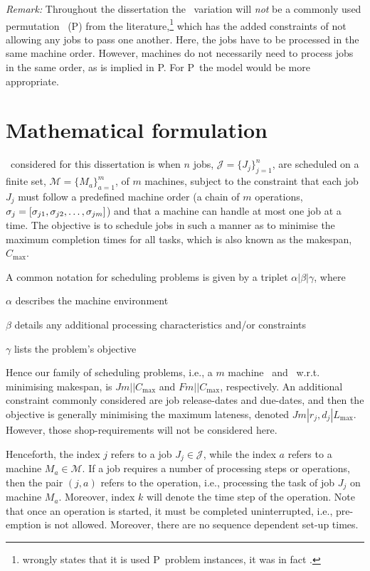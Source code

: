 \emph{Remark:} Throughout the dissertation the \FSP\ variation will \emph{not} 
be a commonly used permutation \fsp\ (P\FSP) from the 
literature,\footnote{ wrongly states that it is used P\FSP\ problem
    instances, it was in fact \FSP.} 
which has the added constraints of not allowing any jobs to pass one another.
Here, the jobs have to be processed in the same machine order. However, 
machines do not necessarily need to process jobs in the same order, as is 
implied in P\FSP. For P\FSP\ the \citet{Manne60} model would be more 
appropriate.

\section{Mathematical formulation}
\Jsp\ considered for this dissertation is when $n$ jobs, 
$\mathcal{J}=\{J_j\}_{j=1}^n$, are scheduled on a finite set, 
$\mathcal{M}=\{M_a\}_{a=1}^m$, of $m$ machines, subject to the constraint that 
each job $J_j$ must follow a predefined machine order (a chain of 
$m$ operations, ${\mathbf{\sigma}}_j=[\sigma_{j1},\sigma_{j2},\dotsc,\sigma_{jm}]$) and 
that a machine can handle at most one job at a time. 
The objective is to schedule jobs in such a manner as to minimise the maximum 
completion times for all tasks, which is also known as the makespan, 
$C_{\max}$. 

A common notation for scheduling problems \citep[cf. Chapter 2 in ][]{Pinedo08} 
is given by a triplet $\alpha|\beta|\gamma$, where 
\begin{enumerate*}[itemjoin*={, and finally}, label={{}}]
  \item $\alpha$ describes the machine environment
  \item $\beta$ details any additional processing characteristics and/or 
  constraints
  \item $\gamma$ lists the problem's objective
\end{enumerate*}
Hence our family of scheduling problems, i.e., a $m$ machine \JSP\ and \FSP\ 
w.r.t. minimising makespan, is $Jm||C_{\max}$ and $Fm||C_{\max}$, respectively. 
An additional constraint commonly considered are job release-dates and 
due-dates, and then the objective is generally minimising the maximum lateness, 
denoted $Jm|r_j,d_j|L_{\max}$. 
However, those shop-requirements will not be considered here. 

Henceforth, the index $j$ refers to a job $J_j\in\mathcal{J}$, while the index 
$a$ refers to a machine $M_a\in\mathcal{M}$. If a job requires a number of 
processing steps or operations, then the pair $(j,a)$ refers to the operation, 
i.e., processing the task of job $J_j$ on machine $M_a$. Moreover, index $k$ 
will denote the time step of the operation. Note that once an operation is 
started, it must be completed uninterrupted, i.e., pre-emption is not allowed. 
Moreover, there are no sequence dependent set-up times.

